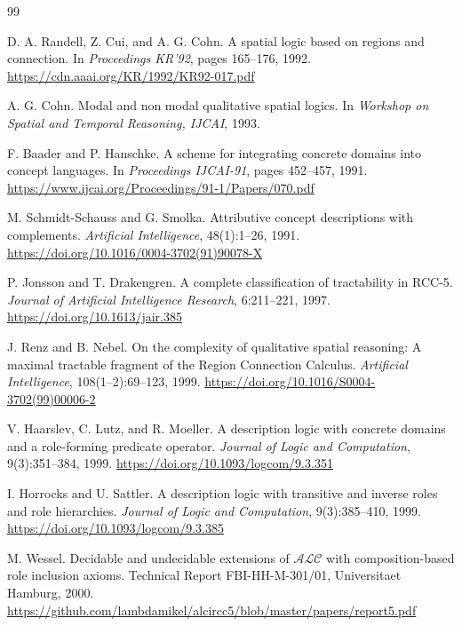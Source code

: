 \documentclass[11pt]{article}
\begin{document}
\clearpage
\begin{thebibliography}{99}

D. A. Randell, Z. Cui, and A. G. Cohn.
\newblock A spatial logic based on regions and connection.
\newblock In \emph{Proceedings KR'92}, pages 165--176, 1992.
\newblock \url{https://cdn.aaai.org/KR/1992/KR92-017.pdf}

A. G. Cohn.
\newblock Modal and non modal qualitative spatial logics.
\newblock In \emph{Workshop on Spatial and Temporal Reasoning, IJCAI}, 1993.

F. Baader and P. Hanschke.
\newblock A scheme for integrating concrete domains into concept languages.
\newblock In \emph{Proceedings IJCAI-91}, pages 452--457, 1991.
\newblock \url{https://www.ijcai.org/Proceedings/91-1/Papers/070.pdf}

M. Schmidt-Schauss and G. Smolka.
\newblock Attributive concept descriptions with complements.
\newblock \emph{Artificial Intelligence}, 48(1):1--26, 1991.
\newblock \url{https://doi.org/10.1016/0004-3702(91)90078-X}

P. Jonsson and T. Drakengren.
\newblock A complete classification of tractability in RCC-5.
\newblock \emph{Journal of Artificial Intelligence Research}, 6:211--221, 1997.
\newblock \url{https://doi.org/10.1613/jair.385}

J. Renz and B. Nebel.
\newblock On the complexity of qualitative spatial reasoning: A maximal tractable
fragment of the Region Connection Calculus.
\newblock \emph{Artificial Intelligence}, 108(1--2):69--123, 1999.
\newblock \url{https://doi.org/10.1016/S0004-3702(99)00006-2}

V. Haarslev, C. Lutz, and R. Moeller.
\newblock A description logic with concrete domains and a role-forming predicate
operator.
\newblock \emph{Journal of Logic and Computation}, 9(3):351--384, 1999.
\newblock \url{https://doi.org/10.1093/logcom/9.3.351}

I. Horrocks and U. Sattler.
\newblock A description logic with transitive and inverse roles and role hierarchies.
\newblock \emph{Journal of Logic and Computation}, 9(3):385--410, 1999.
\newblock \url{https://doi.org/10.1093/logcom/9.3.385}

M. Wessel.
\newblock Decidable and undecidable extensions of $\mathcal{ALC}$ with
composition-based role inclusion axioms.
\newblock Technical Report FBI-HH-M-301/01, Universitaet Hamburg, 2000.
\newblock \url{https://github.com/lambdamikel/alcircc5/blob/master/papers/report5.pdf}


\end{thebibliography}
\end{document}
